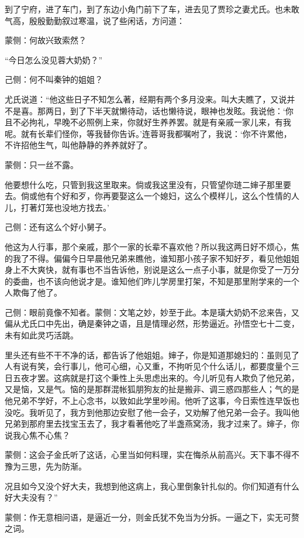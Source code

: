 \begin{parag}
    到了宁府，进了车门，到了东边小角门前下了车，进去见了贾珍之妻尤氏。也未敢气高，殷殷勤勤叙过寒温，说了些闲话，方问道：\begin{note}蒙侧：何故兴致索然？\end{note}“今日怎么没见蓉大奶奶？”\begin{note}己侧：何不叫秦钟的姐姐？\end{note}尤氏说道：“他这些日子不知怎么著，经期有两个多月没来。叫大夫瞧了，又说并不是喜。那两日，到了下半天就懒待动，话也懒待说，眼神也发眩。我说他：‘你且不必拘礼，早晚不必照例上来，你就好生养养罢。就是有亲戚一家儿来，有我呢。就有长辈们怪你，等我替你告诉。’连蓉哥我都嘱咐了，我说：‘你不许累他，不许招他生气，叫他静静的养养就好了。\begin{note}蒙侧：只一丝不露。\end{note}他要想什么吃，只管到我这里取来。倘或我这里没有，只管望你琏二婶子那里要去。倘或他有个好和歹，你再要娶这么一个媳妇，这么个模样儿，这么个性情的人儿，打著灯笼也没地方找去。’\begin{note}己侧：还有这么个好小舅子。\end{note}他这为人行事，那个亲戚，那个一家的长辈不喜欢他？所以我这两日好不烦心，焦的我了不得。偏偏今日早晨他兄弟来瞧他，谁知那小孩子家不知好歹，看见他姐姐身上不大爽快，就有事也不当告诉他，别说是这么一点子小事，就是你受了一万分的委曲，也不该向他说才是。谁知他们昨儿学房里打架，不知是那里附学来的一个人欺侮了他了。\begin{note}己侧：眼前竟像不知者。蒙侧：文笔之妙，妙至于此。本是璜大奶奶不忿来告，又偏从尤氏口中先出，确是秦钟之语，且是情理必然，形势逼近。孙悟空七十二变，未有如此灵巧活跳。\end{note}里头还有些不干不净的话，都告诉了他姐姐。婶子，你是知道那媳妇的：虽则见了人有说有笑，会行事儿，他可心细，心又重，不拘听见个什么话儿，都要度量个三日五夜才罢。这病就是打这个秉性上头思虑出来的。今儿听见有人欺负了他兄弟，又是恼，又是气。恼的是那群混帐狐朋狗友的扯是搬非、调三惑四那些人；气的是他兄弟不学好，不上心念书，以致如此学里吵闹。他听了这事，今日索性连早饭也没吃。我听见了，我方到他那边安慰了他一会子，又劝解了他兄弟一会子。我叫他兄弟到那府里去找宝玉去了，我才看著他吃了半盏燕窝汤，我才过来了。婶子，你说我心焦不心焦？\begin{note}蒙侧：这会子金氏听了这话，心里当如何料理，实在悔杀从前高兴。天下事不得不豫为三思，先为防渐。\end{note}况且如今又没个好大夫，我想到他这病上，我心里倒象针扎似的。你们知道有什么好大夫没有？”\begin{note}蒙侧：作无意相问语，是逼近一分，则金氏犹不免当为分拆。一逼之下，实无可赘之词。\end{note}
\end{parag}


